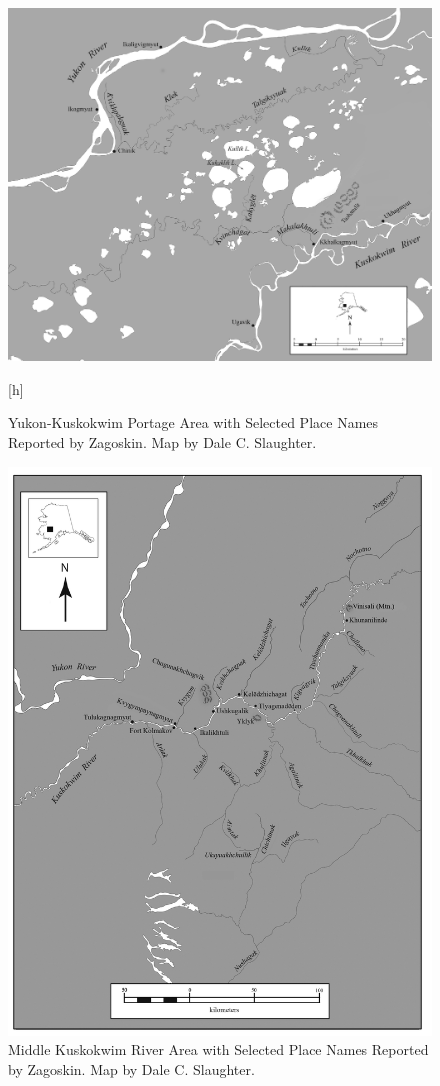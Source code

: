 \clearpage
\begin{figure}[h]
    \centering
    \includegraphics[width=\textwidth]{figures/pratt-fig5.png}
\caption{Yukon-Kuskokwim Portage Area with Selected Place Names Reported by Zagoskin. Map by Dale C. Slaughter.}
\label{pratt-fig5}[h]
\end{figure}

\clearpage
\begin{figure}[h]
    \centering
    \includegraphics[width=\textwidth]{figures/pratt-fig6.png}
\caption{Middle Kuskokwim River Area with Selected Place Names Reported by Zagoskin. Map by Dale C. Slaughter.}
\label{pratt-fig6}
\end{figure}








\label{pratt-ch-end}
